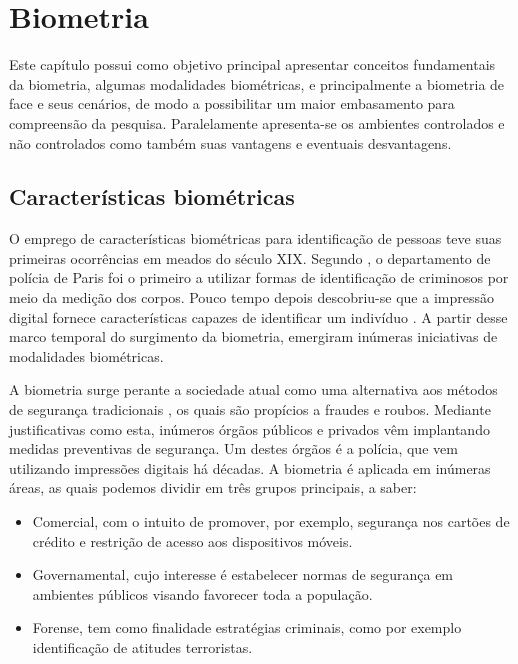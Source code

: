 \chapter{Biometria}
\label{cp:cap2}
Este capítulo possui como objetivo principal apresentar conceitos fundamentais da biometria, algumas modalidades biométricas, e principalmente a biometria de face e seus cenários, de modo a possibilitar um maior embasamento para compreensão da pesquisa.  Paralelamente apresenta-se os ambientes controlados e não controlados como também suas vantagens e eventuais desvantagens. 

\section{Características biométricas}


O emprego de características biométricas para identificação de pessoas teve suas primeiras ocorrências em meados do século XIX. Segundo , o departamento de polícia de Paris foi o primeiro a utilizar formas de identificação de criminosos por meio da medição dos corpos. Pouco tempo depois descobriu-se que a impressão digital fornece características capazes de identificar um indivíduo \cite{jain2004introduction}. A partir desse marco temporal do surgimento da biometria, emergiram inúmeras iniciativas de modalidades biométricas.

A biometria surge perante a sociedade atual como uma alternativa aos  métodos de segurança tradicionais \cite{sharif2012survey}, os quais são propícios a fraudes e roubos. Mediante justificativas como esta, inúmeros órgãos públicos e privados vêm implantando medidas preventivas de segurança. Um destes órgãos é a polícia, que vem utilizando impressões digitais há décadas. A biometria é aplicada em inúmeras áreas, as quais podemos dividir em três grupos principais, a saber:
\begin{itemize}
\item Comercial, com o intuito de  promover, por exemplo, segurança nos cartões de crédito e restrição de acesso aos dispositivos móveis.
\item Governamental, cujo interesse é estabelecer normas de segurança em ambientes públicos visando favorecer toda a população.
\item Forense, tem como finalidade estratégias criminais, como por exemplo identificação de atitudes terroristas.
\end{itemize}
